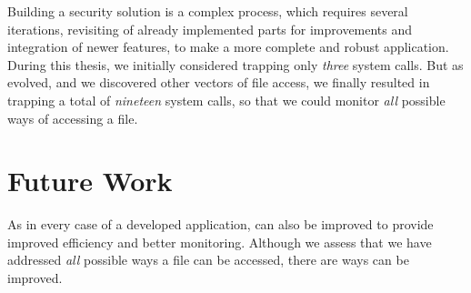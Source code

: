 \par Building a security solution is a complex process, which requires several iterations, revisiting of already implemented parts for improvements and integration of newer features, to make a more complete and robust application. During this thesis, we initially considered trapping only \emph{three} system calls. But as  evolved, and we discovered other vectors of file access, we finally resulted in trapping a total of \emph{nineteen} system calls, so that we could monitor \emph{all} possible ways of accessing a file.


\section{Future Work}

\par As in every case of a developed application,  can also be improved to provide improved efficiency and better monitoring. Although we assess that we have addressed \emph{all} possible ways a file can be accessed, there are ways  can be improved.

